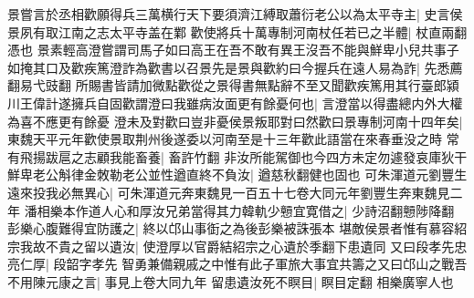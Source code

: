 景嘗言於丞相歡願得兵三萬横行天下要須濟江縛取蕭衍老公以為太平寺主|{
	史言侯景夙有取江南之志太平寺盖在鄴}
歡使將兵十萬專制河南杖任若已之半體|{
	杖直兩翻憑也}
景素輕高澄嘗謂司馬子如曰高王在吾不敢有異王沒吾不能與鮮卑小兒共事子如掩其口及歡疾篤澄詐為歡書以召景先是景與歡約曰今握兵在遠人易為詐|{
	先悉薦翻易弋豉翻}
所賜書皆請加微點歡從之景得書無點辭不至又聞歡疾篤用其行臺郎潁川王偉計遂擁兵自固歡謂澄曰我雖病汝面更有餘憂何也|{
	言澄當以得盡總内外大權為喜不應更有餘憂}
澄未及對歡曰豈非憂侯景叛耶對曰然歡曰景專制河南十四年矣|{
	東魏天平元年歡使景取荆州後遂委以河南至是十三年歡此語當在來春垂没之時}
常有飛揚跋扈之志顧我能畜養|{
	畜許竹翻}
非汝所能駕御也今四方未定勿遽發哀庫狄干鮮卑老公斛律金敇勒老公並性遒直終不負汝|{
	遒慈秋翻健也固也}
可朱渾道元劉豐生遠來投我必無異心|{
	可朱渾道元奔東魏見一百五十七卷大同元年劉豐生奔東魏見二年}
潘相樂本作道人心和厚汝兄弟當得其力韓軌少戅宜寛借之|{
	少詩沼翻戅陟降翻}
彭樂心腹難得宜防護之|{
	終以邙山事衘之為後彭樂被誅張本}
堪敵侯景者惟有慕容紹宗我故不貴之留以遺汝|{
	使澄厚以官爵結紹宗之心遺於季翻下患遺同}
又曰段孝先忠亮仁厚|{
	段韶字孝先}
智勇兼備親戚之中惟有此子軍旅大事宜共籌之又曰邙山之戰吾不用陳元康之言|{
	事見上卷大同九年}
留患遺汝死不瞑目|{
	瞑目定翻}
相樂廣寧人也

